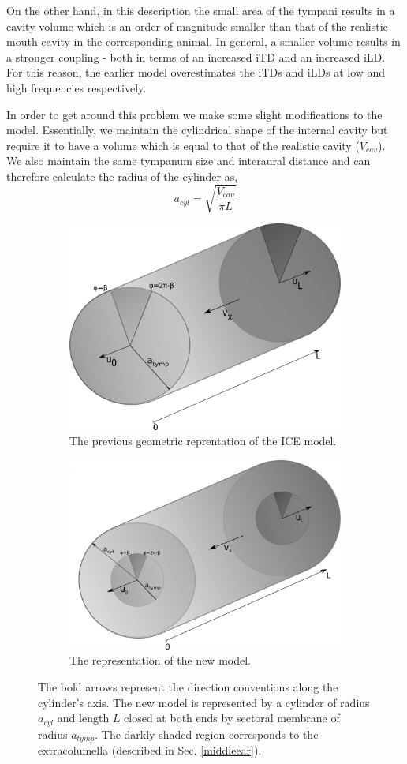 On the other hand, in this description the small area of the tympani results in a cavity volume which 
is an order of magnitude smaller than that of the realistic mouth-cavity in the corresponding animal. In general, a smaller volume results in a stronger coupling - both in terms of an increased iTD and an increased
iLD. For this reason, the earlier model overestimates the iTDs and iLDs at
low and high frequencies respectively.

In order to get around this problem we make some slight modifications to the model. Essentially, we maintain the cylindrical shape of the internal 
cavity but require it to have a volume which is equal to that of the realistic cavity ($V_{cav}$). We also maintain the same tympanum size and interaural distance
and can therefore calculate the radius of the cylinder as,
\begin{equation}\label{cylinderradiusformula}
 a_{cyl}=\sqrt{\frac{V_{cav}}{\pi L}}
\end{equation}
\begin{figure}[ht!]
\begin{center}
\begin{subfigure}{1.0\textwidth}
 \centering
  \includegraphics[width=.5\linewidth]{Diagrams/oldCylinder.png}
   \caption[Previous ICE Model Cylinder]{The previous geometric reprentation of the ICE model.}
  \label{oldICE}
\end{subfigure}

\begin{subfigure}{1.0\textwidth}
\centering
  \includegraphics[width=.5\linewidth]{Diagrams/newCylinder.png}
  \caption[New ICE Model Cylinder]{The representation of the new model.}
  \label{newICE}
  \end{subfigure}
  \caption[Previous and current ICE model representations]{The bold arrows represent the direction conventions
  along the cylinder's axis. The new model is represented by a cylinder of radius $a_{cyl}$ and length $L$ closed
  at both ends by sectoral membrane of radius $a_{tymp}$.
  The darkly shaded region corresponds to the extracolumella (described in Sec. \ref{middleear}).}
\end{center}
\end{figure}
